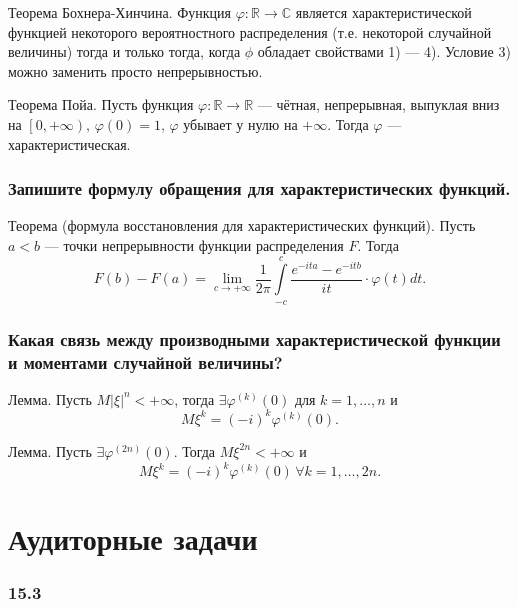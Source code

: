 Теорема Бохнера-Хинчина.
Функция $ \varphi: \mathbb{R} \rightarrow \mathbb{C}$
является характеристической функцией некоторого вероятностного распределения
(т.е. некоторой случайной величины)
тогда и только тогда, когда $ \phi $ обладает свойствами 1) --- 4).
Условие 3) можно заменить просто непрерывностью.

Теорема Пойа.
Пусть функция $ \varphi: \mathbb{R} \rightarrow \mathbb{R}$ --- чётная, непрерывная,
выпуклая вниз на $ \left[ 0, + \infty \right), \, \varphi \left( 0 \right) = 1, \, \varphi $
убывает у нулю на $+ \infty $.
Тогда $ \varphi $ --- характеристическая.

\subsubsection*{Запишите формулу обращения для характеристических функций.}

Теорема (формула восстановления для характеристических функций).
Пусть $ a < b$ --- точки непрерывности функции распределения $F$.
Тогда
$$F \left( b \right) - F \left( a \right) =
  \lim \limits_{c \to + \infty }
    \frac{1}{2 \pi } \int \limits_{-c}^c \frac{e^{-ita} - e^{-itb}}{it} \cdot \varphi(t) dt.$$

\subsubsection*{Какая связь между производными характеристической функции и моментами случайной
                величины?}

Лемма.
Пусть $M \left| \xi \right|^n < + \infty $,
тогда $ \exists \varphi^{ \left( k \right) } \left( 0 \right) $ для
$k = 1, \dotsc, n$ и
$$M \xi^k =
\left( -i \right)^k \varphi^{ \left( k \right) } \left( 0 \right).$$

Лемма.
Пусть $ \exists \varphi^{ \left( 2n \right) } \left( 0 \right) $.
Тогда $M \xi^{2n} < + \infty $ и
$$M \xi^k = \left( -i \right)^k \varphi^{ \left( k \right) } \left( 0 \right) \,
\forall k = 1, \dotsc, 2n.$$

\section*{Аудиторные задачи}

\subsubsection*{15.3}

